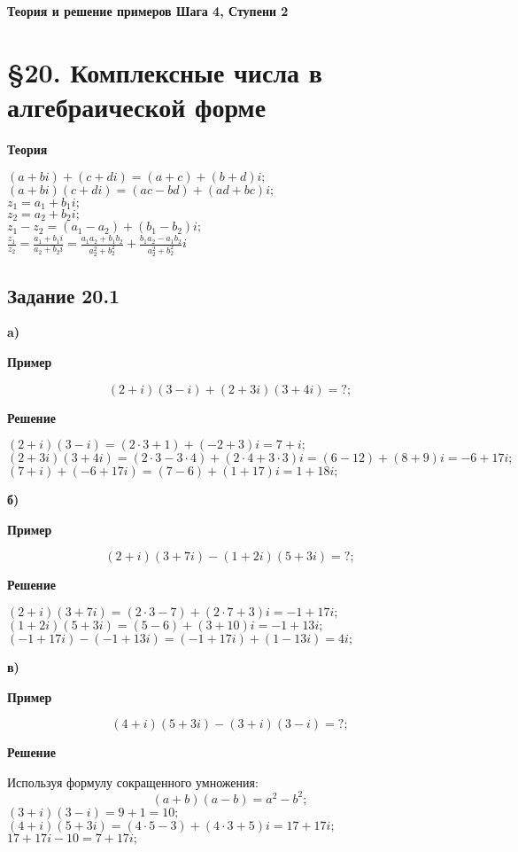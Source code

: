 \documentclass[12pt]{article}
\begin{document}
\begin{titlepage}
\begin{center}
\textbf{\huge Теория  и решение примеров Шага 4, Ступени 2}
\end{center}
\end{titlepage}
\tableofcontents
\newpage
\section{\S 20. Комплексные числа в алгебраической форме}
\begin{center}\textbf{Теория}\end{center}
$ (a+bi) + (c+di) = (a+c)+(b+d)i; $ \\
$ (a+bi)(c+di) = (ac-bd)+(ad+bc)i; $\\
$ z_1 = a_1+b_1i;$\\
$ z_2 = a_2+b_2i;$\\
$ z_1 - z_2 = (a_1-a_2)+(b_1-b_2)i; $\\
$
\displaystyle
\frac{z_1}{z_2}=
\frac{a_1+b_1i}{a_2+b_2i}=
\frac{a_1 a_2 + b_1 b_2}{a_2^2+b_2^2}+
\frac{b_1 a_2 - a_1 b_2}{a_2^2+b_2^2}i
$
\subsection{Задание 20.1}

\textbf{a)}\\
\begin{center}\textbf{Пример}\end{center}
$$(2+i)(3-i)+(2+3i)(3+4i) = ?;$$
\begin{center}\textbf{Решение}\end{center}
$(2+i)(3-i)=(2\cdot3+1)+(-2+3)i = 7+i;$\\
$(2+3i)(3+4i) =(2\cdot3-3\cdot4)+( 2\cdot 4+3\cdot3)i=(6-12)+(8+9)i=-6+17i;$\\
$(7+i)+(-6+17i)=(7-6)+(1+17)i=1+18i;$

\newpage
\textbf{б)}\\
\begin{center}\textbf{Пример}\end{center}
$$(2+i)(3+7i)-(1+2i)(5+3i) = ?;$$
\begin{center}\textbf{Решение}\end{center}
$(2+i)(3+7i) = (2\cdot3-7)+(2\cdot7+3)i=-1+17i;$\\
$(1+2i)(5+3i) =(5-6)+(3+10)i = -1+13i;$\\
$(-1+17i)-(-1+13i)=(-1+17i)+(1-13i)=4i;$

\newpage
\textbf{в)}\\
\begin{center}\textbf{Пример}\end{center}
$$(4+i)(5+3i)-(3+i)(3-i) = ?;$$
\begin{center}\textbf{Решение}\end{center}
Используя формулу сокращенного умножения:
$$(a+b)(a-b)=a^2-b^2;$$
$(3+i)(3-i) = 9 + 1 = 10;$\\
$(4+i)(5+3i)= (4\cdot5 - 3)+(4\cdot3+5)i=17+17i;$\\
$17+17i-10=7+17i;$
\end{document}
